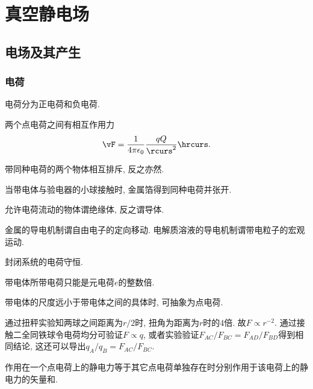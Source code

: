\documentclass[../Electromagnetism.tex]{subfiles}
\begin{document}
\section{真空静电场} %
\label{sec:真空静电场}

\subsection{电场及其产生} %
\label{sub:电场及其产生}

\subsubsection{电荷} %
\label{ssub:电荷}

\begin{definition}[电荷的分类]
	电荷分为正电荷和负电荷.
\end{definition}
\begin{finale}
	\begin{axiom}[Coulomb定律]
		\label{ax:Coulomb定律}
		两个点电荷之间有相互作用力
		\[ \vF = \frac{1}{4\pi\epsilon_0} \frac{q Q}{\rcurs^2}\hrcurs. \]
	\end{axiom}
\end{finale}
\begin{corollary}
	带同种电荷的两个物体相互排斥, 反之亦然.
\end{corollary}
\begin{ex}
	当带电体与验电器的小球接触时, 金属箔得到同种电荷并张开.
\end{ex}
\begin{definition}[绝缘体和导体]
	允许电荷流动的物体谓绝缘体, 反之谓导体.
\end{definition}
金属的导电机制谓自由电子的定向移动. 电解质溶液的导电机制谓带电粒子的宏观运动.
\begin{axiom}[电荷守恒]
	封闭系统的电荷守恒.
\end{axiom}
\begin{axiom}[电荷量子化]
	带电体所带电荷只能是元电荷$e$的整数倍.
\end{axiom}
\begin{definition}[点电荷模型]
	带电体的尺度远小于带电体之间的具体时, 可抽象为点电荷.
\end{definition}
\begin{ex}[Coulomb定律的验证]
	通过扭秤实验知两球之间距离为$r/2$时, 扭角为距离为$r$时的$4$倍. 故$F\propto r^{-2}$. 通过接触二全同铁球令电荷均分可验证$F\propto q$, 或者实验验证$F_{AC}/F_{BC} = F_{AD}/F_{BD}$得到相同结论, 这还可以导出$q_A/q_B = F_{AC}/F_{BC}$.
\end{ex}
\begin{axiom}[叠加原理]
	作用在一个点电荷上的静电力等于其它点电荷单独存在时分别作用于该电荷上的静电力的矢量和.
\end{axiom}
\end{document}
